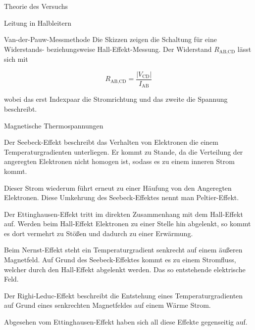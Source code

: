 \documentclass[pdftex, a4paper,11pt, twoside, ngerman]{report}
\newcommand\abs[1]{\left| #1 \right|}
\begin{document}
\begin{chapter}{Theorie des Versuchs}
\begin{section}{Leitung in Halbleitern}
\begin{subsection}{Van-der-Pauw-Messmethode}
            Die Skizzen zeigen die Schaltung für eine Widerstands- beziehungsweise Hall-Effekt-Messung.
            Der Widerstand $R_\text{AB,CD}$ lässt sich mit 
            
            \[
                R_\text{AB,CD} = \frac{\abs{V_\text{CD}}}{I_\text{AB}}
            \]
            
            wobei das erst Indexpaar die Stromrichtung und das zweite die Spannung beschreibt. 

        \end{subsection}

        \begin{subsection}{Magnetische Thermospannungen}

                Der Seebeck-Effekt beschreibt das Verhalten von Elektronen die einem Temperaturgradienten unterliegen. 
                Er kommt zu Stande, da die Verteilung der angeregten Elektronen nicht homogen ist, sodass es zu einem inneren Strom kommt.
                
                Dieser Strom wiederum führt erneut zu einer Häufung von den Angeregten Elektronen.
                Diese Umkehrung des Seebeck-Effektes nennt man Peltier-Effekt.


                Der Ettinghausen-Effekt tritt im direkten Zusammenhang mit dem Hall-Effekt auf.
                Werden beim Hall-Effekt Elektronen zu einer Stelle hin abgelenkt, so kommt es dort vermehrt zu Stößen und dadurch zu einer Erwärmung.
                
                Beim Nernst-Effekt steht ein Temperaturgradient senkrecht auf einem äußeren Magnetfeld.
                Auf Grund des Seebeck-Effektes kommt es zu einem Stromfluss, welcher durch den Hall-Effekt abgelenkt werden.
                Das so entstehende elektrische Feld.


                Der Righi-Leduc-Effekt beschreibt die Entstehung eines Temperaturgradienten auf Grund eines senkrechten Magnetfeldes auf einem Wärme Strom.

                Abgesehen vom Ettinghausen-Effekt haben sich all diese Effekte gegenseitig auf.

        \end{subsection}

    \end{section}
    
    
  \end{chapter}
\end{document}
